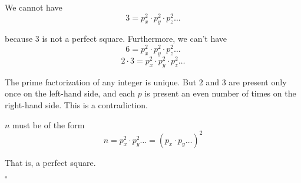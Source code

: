 \documentclass[11pt, oneside]{article}
\begin{document}
We cannot have 
\[ 3 =  p_x^2 \cdot p_y^2 \cdot p_z^2 \dots \]

because $3$ is not a perfect square.  Furthermore, we can't have
\[ 6 =  p_x^2 \cdot p_y^2 \cdot p_z^2 \dots \]
\[ 2 \cdot 3 =  p_x^2 \cdot p_y^2 \cdot p_z^2 \dots \]

The prime factorization of any integer is unique.  But $2$ and $3$ are present only once on the left-hand side, and each $p$ is present an even number of times on the right-hand side.  This is a contradiction.

$n$ must be of the form
\[ n = p_x^2 \cdot p_y^2 \dots = (p_x \cdot p_y \dots)^2 \]

That is, a perfect square.

$\square$
\end{document}
